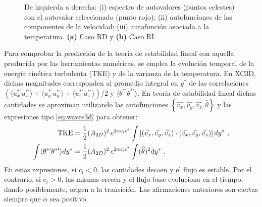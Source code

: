\begin{figure}[H]
 \centering 
      
 \caption{De izquierda a derecha: (i) espectro de autovalores (puntos celestes) con el autovalor seleccionado (punto rojo); (ii) autofunciones de las componentes de la velocidad; (iii) autofunción asociada a la temperatura. \textbf{(a)} Caso RD y \textbf{(b)} Caso RI.} 
 \label{fig:Ra65-2d}
\end{figure}



Para comprobar la predicción de la teoría de estabilidad lineal con aquella producida por las herramientas numéricas, se emplea la evolución temporal de la energía cinética turbulenta (TKE) y de la varianza de la temperatura. En XC3D, dichas magnitudes corresponden al promedio integral en $y^*$ de las correlaciones $( \langle u^{* \prime}_x u^{* \prime}_x \rangle + \langle u^{* \prime}_y u^{* \prime}_y  \rangle + \langle u^{* \prime}_z u^{* \prime}_z  \rangle) / 2$ y $\langle \theta^{* \prime} \theta^{* \prime} \rangle$. En teoría de estabilidad lineal dichas cantidades se aproximan utilizando las autofunciones $\left\lbrace \widehat{v_x}, \widehat{v_y}, \widehat{v_z}, \widehat{\theta} \right\rbrace$ y las expresiones tipo \ref{eq:waves3d} para obtener:
\begin{align}
\text{TKE} &= \frac{1}{2} (A_{2D})^2 \hspace*{0.5mm} e^{2 \alpha c_i t^*} \int \left[  ( \widehat{v_x}, \widehat{v_y}, \widehat{v_z} ) \cdot ( \widehat{v_x}, \widehat{v_y}, \widehat{v_z} )  \right] dy^* \text{ ,} \\
\int \langle \theta^{* \prime} \theta^{* \prime} \rangle dy^* &= \frac{1}{2} (A_{2D})^2 \hspace*{0.5mm} e^{2 \alpha c_i t^*} \int (\widehat{\theta})^2 dy^* \text{ .}
\end{align}   
En estas expresiones, si $c_i < 0$, las cantidades decaen y el flujo es estable. Por el contrario, si $c_i > 0$, las mismas crecen y el flujo base evoluciona en el tiempo, dando posiblemente, origen a la transición. Las afirmaciones anteriores son ciertas siempre que $\alpha$ sea positivo.

